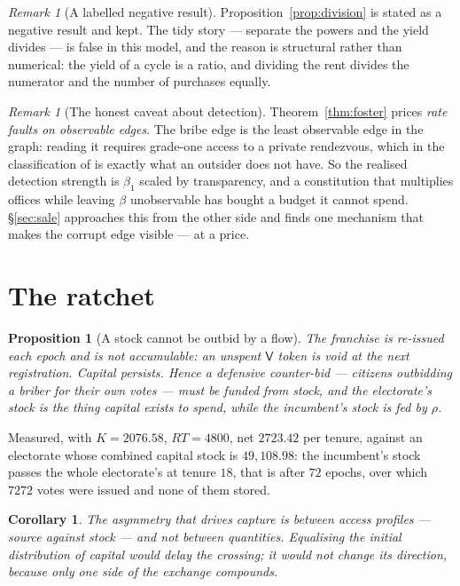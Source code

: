\documentclass[11pt]{article}
\theoremstyle{plain}
\newtheorem{proposition}[theorem]{Proposition}
\newtheorem{corollary}[theorem]{Corollary}
\theoremstyle{definition}
\theoremstyle{remark}
\newtheorem{remark}[theorem]{Remark}
\newcommand{\bt}{\beta_1}
\newcommand{\Vt}{\mathsf{V}}
\begin{document}
\begin{remark}[A labelled negative result]
Proposition~\ref{prop:division} is stated as a negative result and kept. The
tidy story --- separate the powers and the yield divides --- is false in this
model, and the reason is structural rather than numerical: the yield of a cycle
is a ratio, and dividing the rent divides the numerator and the number of
purchases equally.
\end{remark}

\begin{remark}[The honest caveat about detection]
\label{rem:transparency}
Theorem~\ref{thm:foster} prices \emph{rate faults on observable edges}. The
bribe edge is the least observable edge in the graph: reading it requires
grade-one access to a private rendezvous, which in the classification of
\cite[\S2]{scientist} is exactly what an outsider does not have. So the realised
detection strength is $\bt$ scaled by transparency, and a constitution that
multiplies offices while leaving $\beta$ unobservable has bought a budget it
cannot spend. \S\ref{sec:sale} approaches this from the other side and finds one
mechanism that makes the corrupt edge visible --- at a price.
\end{remark}

\section{The ratchet}
\label{sec:ratchet}

\begin{proposition}[A stock cannot be outbid by a flow]
\label{prop:ratchet}
The franchise is re-issued each epoch and is not accumulable: an unspent $\Vt$
token is void at the next registration. Capital persists. Hence a defensive
counter-bid --- citizens outbidding a briber for their own votes --- must be
funded from stock, and the electorate's stock is the thing capital exists to
spend, while the incumbent's stock is fed by $\rho$.
\end{proposition}

Measured, with $K = 2076.58$, $RT = 4800$, net $2723.42$ per tenure, against an
electorate whose combined capital stock is $49{,}108.98$: the incumbent's stock
passes the whole electorate's at tenure $18$, that is after $72$ epochs, over
which $7272$ votes were issued and none of them stored.

\begin{corollary}
The asymmetry that drives capture is between \emph{access profiles} --- source
against stock --- and not between quantities. Equalising the initial
distribution of capital would delay the crossing; it would not change its
direction, because only one side of the exchange compounds.
\end{corollary}
\end{document}
